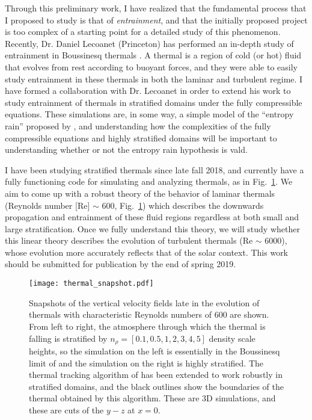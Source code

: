 \documentclass[aasms,12pt]{article}
\begin{document}
Through this preliminary work, I have realized that the fundamental process that I proposed
to study is that of \emph{entrainment}, and that the initially proposed project is too complex
of a starting point for a detailed study of this phenomenon. 
Recently, Dr. Daniel Lecoanet (Princeton) has performed an in-depth study of entrainment 
in Boussinesq thermals \citep[][in review]{lecoanet&jeevanjee2018}. A thermal is a region of
cold (or hot) fluid that evolves from rest according to buoyant forces, and they were able to
easily study entrainment in these thermals in both the laminar and turbulent regime.
I have formed a collaboration with Dr. Lecoanet in order to extend his work to study 
entrainment of thermals in stratified domains under the fully compressible equations.
These simulations are, in some way, a simple model of the ``entropy rain'' proposed by
\citet{brandenburg2016}, and understanding how the complexities of the fully compressible equations
and highly stratified domains will be important to understanding whether or not the entropy
rain hypothesis is vald.

I have been studying stratified thermals since late fall 2018, and currently have a
fully functioning code for simulating and analyzing thermals, as in Fig.~\ref{fig:thermals}.
We aim to come up with a robust theory of the behavior of laminar thermals 
(Reynolds number [Re] $\sim$ 600, Fig.~\ref{fig:thermals})
which describes the downwards propagation and entrainment of these fluid regions regardless
at both small and large stratification. Once we fully understand this theory, we will
study whether this linear theory describes the evolution of turbulent thermals (Re $\sim$ 6000),
whose evolution more accurately reflects that of the solar context. This work should be
submitted for publication by the end of spring 2019.

\begin{figure}[t]
\centering
\texttt{[image: thermal\_snapshot.pdf]}
\caption{Snapshots of the vertical velocity fields late in the evolution of thermals with
characteristic Reynolds numbers of 600 are shown. From left to right, the atmosphere through
which the thermal is falling is stratified by $n_\rho = [0.1, 0.5, 1, 2, 3, 4, 5]$ density
scale heights, so the simulation on the left is essentially in the Boussinesq limit of
\citet{lecoanet&jeevanjee2018} and the simulation on the right is highly stratified. The thermal
tracking algorithm of \citet{lecoanet&jeevanjee2018} has been extended to work robustly in 
stratified domains, and the black outlines show the boundaries of the thermal obtained by
this algorithm. These are 3D simulations, and these are cuts of the $y-z$ at $x = 0$.
\label{fig:thermals}}
\end{figure}
\end{document}
